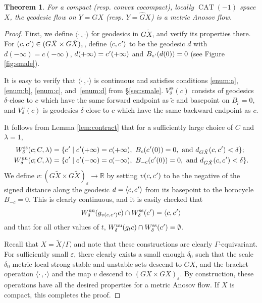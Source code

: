 \documentclass[10pt]{amsart}
\let\epsilon\varepsilon
\let\sep\mid
\newcommand{\lrangle}{\langle\cdot\,,\cdot\rangle}
\newcommand{\cpr}{c\mkern1mu'}
\newcommand{\sts}{\mathrm{ss}}
\newcommand{\uu}{\mathrm{uu}}
\newtheorem{thm}{Theorem}[section]
\theoremstyle{definition}
\numberwithin{equation}{section}
\DeclareMathOperator{\CAT}{CAT}
\begin{document}
\begin{thm} \label{t.smale}
For a compact (resp. convex cocompact), locally $\CAT(-1)$ space $X$, the geodesic flow on $Y= GX$ (resp. $Y=\hat GX$) is a metric Anosov flow.
\end{thm}

\begin{proof}
First, we define $\lrangle$ for geodesics in $G\tilde X$, and verify its properties there. For $(c,\cpr)\in (G\tilde X \times G\tilde X)_\epsilon$, define $\langle c,\cpr\rangle $ to be the geodesic $d$ with $d(-\infty) = c(-\infty)$, $d(+\infty) = \cpr(+\infty)$ and $B_{\cpr}(d(0)) = 0$ (see Figure \ref{fig:smale}).

It is easy to verify that $\lrangle$ is continuous and satisfies conditions \eqref{enum:a}, \eqref{enum:b}, \eqref{enum:c}, and~\eqref{enum:d} from \S \ref{sec:smale}. $V_\delta^{\sts}(c)$ consists of geodesics $\delta$-close to $c$ which have the same forward endpoint as $\tilde c$ and basepoint on $B_{\tilde c} = 0$, and $V_\delta^u(c)$ is geodesics $\delta$-close to $c$ which have the same backward endpoint as $c$.

It follows from Lemma \ref{lem:contract} that for a sufficiently large choice of $C$ and $\lambda = 1$,
\begin{align*}
W^{\sts}_\delta(c;C,\lambda) &= \{\cpr\sep \cpr(+\infty) = c(+\infty), \ B_{c}(\cpr(0))=0, \mbox{ and } d_{G\tilde X}(c,\cpr)<\delta \}; \\
W^{\uu}_\delta(c;C,\lambda) &= \{\cpr\sep \cpr(-\infty) = c(-\infty), \ B_{-c}(\cpr(0))=0, \mbox{ and } d_{G\tilde X}(c,\cpr)<\delta \}. 
\end{align*}
We define $v:(G\tilde X\times G\tilde X)_\epsilon \to \mathbb{R}$ by setting $v(c,\cpr)$ to be the negative of the signed distance along the geodesic $d = \langle c,\cpr\rangle $ from its basepoint to the horocycle $B_{-c}=0$. This is clearly continuous, and it is easily checked that
\[ W^{\uu}_\delta(g_{v(c,\cpr)}c) \cap W^{\sts}_\delta(\cpr) = \langle c,\cpr\rangle \]
and that for all other values of $t$, $W^{\uu}_\delta(g_tc) \cap W^{\sts}_\delta(\cpr) = \emptyset$.

Recall that $X = \tilde X /\Gamma$, and note that these constructions are clearly $\Gamma$-equivariant. For sufficiently small $\epsilon$, there clearly exists a small enough $\delta_0$ such that the scale $\delta_0$ metric local strong stable and unstable sets descend to $GX$, and the bracket operation $\lrangle$ and the map $v$ descend to $(GX \times GX)_\epsilon$. By construction, these operations have all the desired properties for a metric Anosov flow. If $X$ is compact, this completes the proof.


\end{proof}
\end{document}
